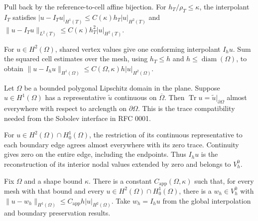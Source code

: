 \begin{lemma}
  \label{lem:p1-affine-scaling}
  \notready
  Pull back by the reference-to-cell affine bijection. For
  $h_T/\rho_T\le\kappa$, the interpolant $I_T$ satisfies
  $|u-I_Tu|_{H^1(T)}\le C(\kappa)h_T|u|_{H^2(T)}$ and
  $\|u-I_Tu\|_{L^2(T)}\le C(\kappa)h_T^2|u|_{H^2(T)}$.
\end{lemma}

\begin{proposition}
  \label{prop:p1-global-interpolation}
  \notready
  For $u\in H^2(\Omega)$, shared vertex values give one conforming interpolant
  $I_hu$. Sum the squared cell estimates over the mesh, using $h_T\le h$
  and $h\le\operatorname{diam}(\Omega)$, to obtain
  $\|u-I_hu\|_{H^1(\Omega)}\le C(\Omega,\kappa)h|u|_{H^2(\Omega)}$.
\end{proposition}

\begin{lemma}
  \label{lem:trace-continuous-representative}
  \notready
  Let $\Omega$ be a bounded polygonal Lipschitz domain in the plane.
  Suppose $u\in H^1(\Omega)$ has a representative $\tilde u$ continuous on
  $\overline{\Omega}$. Then $\operatorname{Tr}u=\tilde u|_{\partial\Omega}$
  almost everywhere with respect to arclength on $\partial\Omega$.
  This is the trace compatibility needed from the Sobolev interface in RFC 0001.
\end{lemma}

\begin{lemma}
  \label{lem:p1-boundary-preservation}
  \notready
  For $u\in H^2(\Omega)\cap H_0^1(\Omega)$, the restriction of its
  continuous representative to each boundary edge agrees almost everywhere
  with its zero trace. Continuity gives zero on the entire edge, including
  the endpoints. Thus $I_hu$ is the reconstruction of its interior nodal
  values extended by zero and belongs to $V_h^0$.
\end{lemma}

\begin{proposition}
  \label{prop:p1-approximation}
  \notready
  Fix $\Omega$ and a shape bound $\kappa$. There is a constant
  $C_{\mathrm{app}}(\Omega,\kappa)$ such that, for every mesh with that bound
  and every $u\in H^2(\Omega)\cap H_0^1(\Omega)$, there is a $w_h\in V_h^0$
  with $\|u-w_h\|_{H^1(\Omega)}\le C_{\mathrm{app}} h |u|_{H^2(\Omega)}$.
  Take $w_h=I_hu$ from the global interpolation and boundary preservation results.
\end{proposition}

